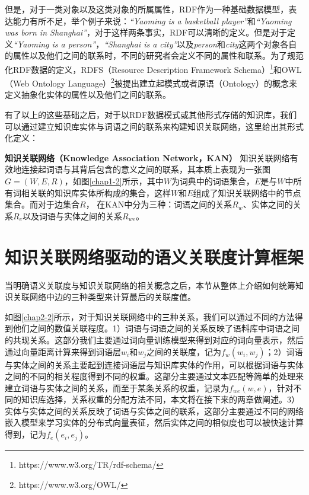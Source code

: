 但是，对于一类对象以及这类对象的所属属性，RDF作为一种基础数据模型，表达能力有所不足，举个例子来说：\emph{“Yaoming is a basketball player”}和\emph{“Yaoming was born in Shanghai”}，对于这样两条事实，RDF可以清晰的定义。但是对于定义\emph{“Yaoming is a person”}，\emph{“Shanghai is a city”}以及\emph{person}和\emph{city}这两个对象各自的属性以及他们之间的联系时，不同的研究者会定义不同的属性和联系。为了规范化RDF数据的定义，RDFS（Resource Description Framework Schema）\footnote{https://www.w3.org/TR/rdf-schema/}和OWL（Web Ontology Language）\footnote{https://www.w3.org/OWL/}被提出建立起模式或者原语（Ontology）的概念来定义抽象化实体的属性以及他们之间的联系。

有了以上的这些基础之后，对于以RDF数据模式或其他形式存储的知识库，我们可以通过建立知识库实体与词语之间的联系来构建知识关联网络，这里给出其形式化定义：
\begin{definition}
    \label{kan}
    {\bf 知识关联网络（Knowledge Association Network，KAN）}
    知识关联网络有效地连接起词语与其背后包含的意义之间的联系，其本质上表现为一张图$G=(W, E, R)$，如图\ref{chap1-2}所示，其中$W$为词典中的词语集合，$E$是与$W$中所有词相关联的知识库实体所构成的集合，这样$W$和$E$组成了知识关联网络中的节点集合。而对于边集合$R$， 在KAN中分为三种：词语之间的关系$R_w$、实体之间的关系$R_e$以及词语与实体之间的关系$R_{we}$。
\end{definition}


\section{知识关联网络驱动的语义关联度计算框架}
\label{chap02-sr}
当明确语义关联度与知识关联网络的相关概念之后，本节从整体上介绍如何统筹知识关联网络中边的三种类型来计算最后的关联度值。

如图\ref{chap2-2}所示，对于知识关联网络中的三种关系，我们可以通过不同的方法得到他们之间的数值关联程度。1）词语与词语之间的关系反映了语料库中词语之间的共现关系。这部分我们主要通过词向量训练模型来得到对应的词向量表示，然后通过向量距离计算来得到词语层$w_i$和$w_j$之间的关联度，记为$f_w(w_i, w_j)$；2）词语与实体之间的关系主要起到连接词语层与知识库实体的作用，可以根据词语与实体之间的不同的相关程度得到不同的权重。这部分主要通过文本匹配等简单的处理来建立词语与实体之间的关系，而至于某条关系的权重，记录为$f_{we}(w, e)$，针对不同的知识库选择，关系权重的分配方法不同，本文将在接下来的两章做阐述。3）实体与实体之间的关系反映了词语与实体之间的联系，这部分主要通过不同的网络嵌入模型来学习实体的分布式向量表征，然后实体之间的相似度也可以被快速计算得到，记为$f_{e}(e_i, e_j)$。

